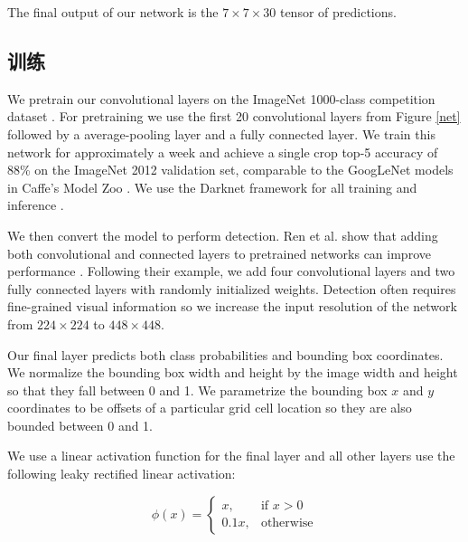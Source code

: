 \documentclass[10pt,twocolumn,letterpaper]{article}
\begin{document}
The final output of our network is the $7 \times 7 \times 30$ tensor of predictions.

\subsection{训练}
%

We pretrain our convolutional layers on the ImageNet 1000-class competition dataset \cite{ILSVRC15}. For pretraining we use the first 20 convolutional layers from Figure \ref{net} followed by a average-pooling layer and a fully connected layer. We train this network for approximately a week and achieve a single crop top-5 accuracy of 88\% on the ImageNet 2012 validation set, comparable to the GoogLeNet models in Caffe's Model Zoo \cite{zoo}. We use the Darknet framework for all training and inference \cite{darknet13}.

We then convert the model to perform detection. Ren et al. show that adding both convolutional and connected layers to pretrained networks can improve performance \cite{DBLP:journals/corr/RenHGZ015}. Following their example, we add four convolutional layers and two fully connected layers with randomly initialized weights. Detection often requires fine-grained visual information so we increase the input resolution of the network from $224 \times 224$ to $448 \times 448$.

Our final layer predicts both class probabilities and bounding box coordinates. We normalize the bounding box width and height by the image width and height so that they fall between 0 and 1. We parametrize the bounding box $x$ and $y$ coordinates to be offsets of a particular grid cell location so they are also bounded between 0 and 1.

We use a linear activation function for the final layer and all other layers use the following leaky rectified linear activation:

\begin{equation}
\phi(x) =
\begin{cases}
    x, & \text{if } x > 0\\
    0.1x, & \text{otherwise}
    \end{cases}
\end{equation}
\end{document}
